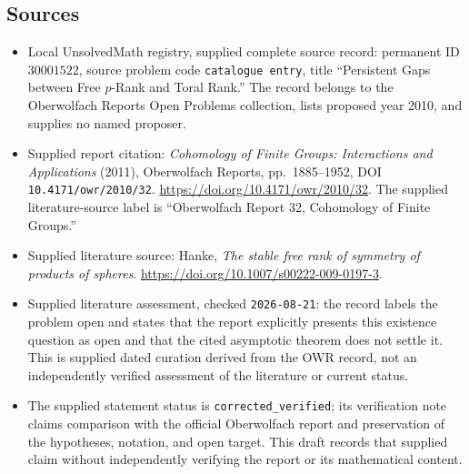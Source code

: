 \documentclass[11pt]{article}
\begin{document}
\subsection{Sources}
\begin{itemize}
\item Local UnsolvedMath registry, supplied complete source record: permanent ID \(30001522\), source problem code \texttt{catalogue entry}, title ``Persistent Gaps between Free \(p\)-Rank and Toral Rank.'' The record belongs to the Oberwolfach Reports Open Problems collection, lists proposed year 2010, and supplies no named proposer.
\item Supplied report citation: \emph{Cohomology of Finite Groups: Interactions and Applications} (2011), Oberwolfach Reports, pp.\ 1885--1952, DOI \texttt{10.4171/owr/2010/32}. \url{https://doi.org/10.4171/owr/2010/32}. The supplied literature-source label is ``Oberwolfach Report 32, Cohomology of Finite Groups.''
\item Supplied literature source: Hanke, \emph{The stable free rank of symmetry of products of spheres}. \url{https://doi.org/10.1007/s00222-009-0197-3}.
\item Supplied literature assessment, checked \texttt{2026-08-21}: the record labels the problem open and states that the report explicitly presents this existence question as open and that the cited asymptotic theorem does not settle it. This is supplied dated curation derived from the OWR record, not an independently verified assessment of the literature or current status.
\item The supplied statement status is \texttt{corrected\_verified}; its verification note claims comparison with the official Oberwolfach report and preservation of the hypotheses, notation, and open target. This draft records that supplied claim without independently verifying the report or its mathematical content.
\end{itemize}
\end{document}
